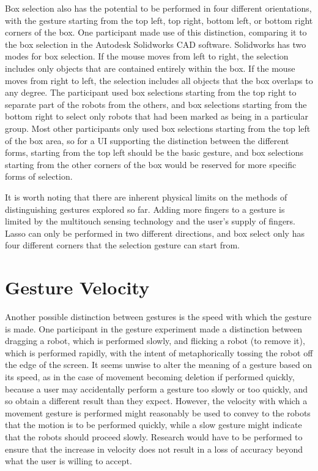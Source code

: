 Box selection also has the potential to be performed in four different orientations, with the gesture starting from the top left, top right, bottom left, or bottom right corners of the box. 
One participant made use of this distinction, comparing it to the box selection in the Autodesk Solidworks CAD software. 
Solidworks has two modes for box selection. 
If the mouse moves from left to right, the selection includes only objects that are contained entirely within the box. 
If the mouse moves from right to left, the selection includes all objects that the box overlaps to any degree. 
The participant used box selections starting from the top right to separate part of the robots from the others, and box selections starting from the bottom right to select only robots that had been marked as being in a particular group. 
Most other participants only used box selections starting from the top left of the box area, so for a UI supporting the distinction between the different forms, starting from the top left should be the basic gesture, and box selections starting from the other corners of the box would be reserved for more specific forms of selection. 

It is worth noting that there are inherent physical limits on the methods of distinguishing gestures explored so far. Adding more fingers to a gesture is limited by the multitouch sensing technology and the user's supply of fingers. 
Lasso can only be performed in two different directions, and box select only has four different corners that the selection gesture can start from. 

\section{Gesture Velocity}

Another possible distinction between gestures is the speed with which the gesture is made. 
One participant in the gesture experiment made a distinction between dragging a robot, which is performed slowly, and flicking a robot (to remove it), which is performed rapidly, with the intent of metaphorically tossing the robot off the edge of the screen. 
It seems unwise to alter the meaning of a gesture based on its speed, as in the case of movement becoming deletion if performed quickly, because a user may accidentally perform a gesture too slowly or too quickly, and so obtain a different result than they expect. 
However, the velocity with which a movement gesture is performed might reasonably be used to convey to the robots that the motion is to be performed quickly, while a slow gesture might indicate that the robots should proceed slowly.
Research would have to be performed to ensure that the increase in velocity does not result in a loss of accuracy beyond what the user is willing to accept.
  
